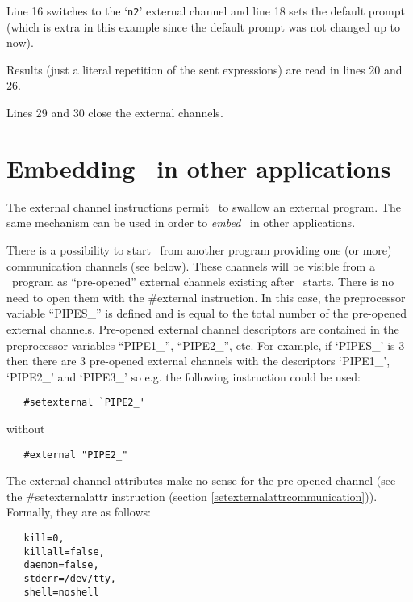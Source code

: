 Line 16 switches to the `\verb|n2|' external channel and line 18 sets
the default prompt (which is extra in this example since the default
prompt was not changed up to now).

Results (just a literal repetition of the sent expressions) are read
in lines 20 and 26.

Lines 29 and 30 close the external channels.


\section{Embedding \FORM\ in other applications}
\label{embeddingcommunication}

The external channel instructions permit \FORM\ to swallow an external 
program. The same mechanism can be used in order to {\em 
embed} \FORM\ in other applications.

There is a possibility to start \FORM\ from another program providing
one (or more) communication channels (see below). These channels will be 
visible from a \FORM\ program as
``pre-opened'' external channels 
existing after \FORM\ starts. There is no need to open them with the 
\#external instruction.
In this case, the preprocessor variable ``PIPES\_'' is 
defined and is equal to the total number of the pre-opened external 
channels. Pre-opened external channel descriptors are contained in the 
preprocessor 
variables ``PIPE1\_'', ``PIPE2\_'', etc.
For example, if `PIPES\_' is 3 then there are 3 
pre-opened external channels with the descriptors `PIPE1\_',
`PIPE2\_' and `PIPE3\_' so e.g. the following instruction could
be used:
\begin{verbatim}
   #setexternal `PIPE2_'
\end{verbatim}
without 
\begin{verbatim}
   #external "PIPE2_"
\end{verbatim}

The external channel attributes make no sense for the pre-opened channel 
(see the \#setexternalattr instruction (section 
\ref{setexternalattrcommunication})).
Formally, they are as follows:
\begin{verbatim}
   kill=0,
   killall=false,
   daemon=false,
   stderr=/dev/tty,
   shell=noshell
\end{verbatim}

